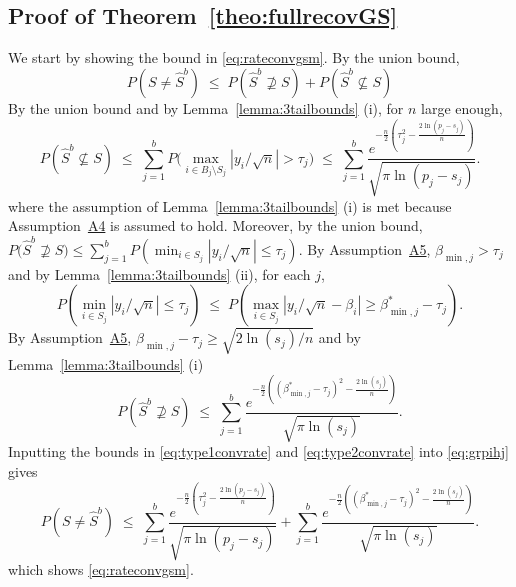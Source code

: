 \documentclass[bj,authoryear]{imsart}
\theoremstyle{plain}
\begin{document}
\subsection{Proof of Theorem~\ref{theo:fullrecovGS}} We start by showing the bound in \eqref{eq:rateconvgsm}. By the union bound,
\begin{equation}\label{eq:grpihj}
    P(S\neq \hat{S}^b) \; \leq\; P(\hat{S}^b\not\supseteq S)+P(\hat{S}^b\not\subseteq S)
\end{equation}
By the union bound and by Lemma~\ref{lemma:3tailbounds} (i), for $n$ large enough,
\begin{equation}\label{eq:type1convrate2}
P\left(\hat{S}^{b} \not\subseteq S\right)\;\leq\; \sum_{j=1}^b P\Big(\max_{i\in B_j\setminus S_j}|y_i/\sqrt{n}|>\tau_{j}\Big)\;\leq\;\sum_{j=1}^b\frac{e^{-\tfrac{n}{2}\left(\tau_j^2-\tfrac{2\ln(p_j-s_j)}{n}\right)}}{\sqrt{\pi\ln(p_j-s_j)}} 	.
 \end{equation}
where the assumption of Lemma~\ref{lemma:3tailbounds} (i) is met because Assumption~\hyperlink{lab:A4}{A4} is assumed to hold. Moreover, by the union bound, 
	$P\big(\hat{S}^{b} \not\supseteq S\big)\leq \sum_{j=1}^b  P\left(\min_{i\in S_j}|y_i/\sqrt{n}|\leq\tau_j\right)$. 
	By Assumption~\hyperlink{lab:A5}{A5}, $\beta_{\min,j}>\tau_j$ and by Lemma~\ref{lemma:3tailbounds} (ii), for each $j$,	
	$$P\left(\min_{i\in S_j}|y_i/\sqrt{n}|\leq\tau_j\right)\;\leq\; P\left(\max_{i\in S_j}|y_i/\sqrt{n}-\beta_i| \geq\beta_{\min,j}^*-\tau_j \right).$$ By Assumption~\hyperlink{lab:A5}{A5}, $\beta_{\min,j}-\tau_j\geq \sqrt{2\ln(s_j)/n}$ and by Lemma~\ref{lemma:3tailbounds} (i)
	\begin{equation}\label{eq:type2convrate2}
P\left(\hat{S}^{b}\not\supseteq S \right) \;\leq\;\sum_{j=1}^b\frac{e^{-\tfrac{n}{2}\left((\beta^*_{\min,j}-\tau_j)^2-\tfrac{2\ln(s_j)}{n}\right)}}{\sqrt{\pi\ln(s_j)}}.
\end{equation}
Inputting the bounds in \eqref{eq:type1convrate} and \eqref{eq:type2convrate} into \eqref{eq:grpihj} gives
\begin{equation}\label{eq:fhfhfhf}
P(S\neq \hat{S}^b) \; \leq\;\sum_{j=1}^b\frac{e^{-\tfrac{n}{2}\left(\tau_j^2-\tfrac{2\ln(p_j-s_j)}{n}\right)}}{\sqrt{\pi\ln(p_j-s_j)}}+\sum_{j=1}^b\frac{e^{-\tfrac{n}{2}\left((\beta^*_{\min,j}-\tau_j)^2-\tfrac{2\ln(s_j)}{n}\right)}}{\sqrt{\pi\ln(s_j)}}.
\end{equation}
which shows \eqref{eq:rateconvgsm}.
\end{document}
